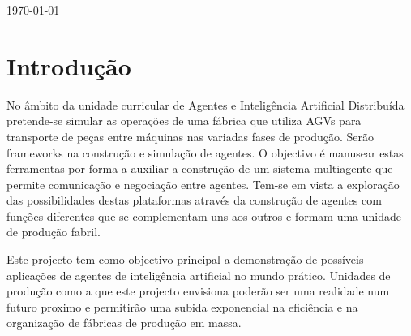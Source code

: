 \begin{titlepage}

{\large \today}\\[0cm] %


\tableofcontents


\section{Introdução} 

\justify\normalsize
No âmbito da unidade curricular de Agentes e Inteligência Artificial Distribuída pretende-se simular as operações de uma fábrica que utiliza AGVs para transporte de peças entre máquinas nas variadas fases de produção. Serão frameworks na construção e simulação de agentes. O objectivo é manusear estas ferramentas por forma a auxiliar a construção de um sistema multiagente que permite comunicação e negociação entre agentes. Tem-se em vista a exploração das possibilidades destas plataformas através da construção de agentes com funções diferentes que se complementam uns aos outros e formam uma unidade de produção fabril.

Este projecto tem como objectivo principal a demonstração de possíveis aplicações de agentes de inteligência artificial no mundo prático. Unidades de produção como a que este projecto envisiona poderão ser uma realidade num futuro proximo e permitirão uma subida exponencial na eficiência e na organização de fábricas de produção em massa.


\newpage %



\end{titlepage}
